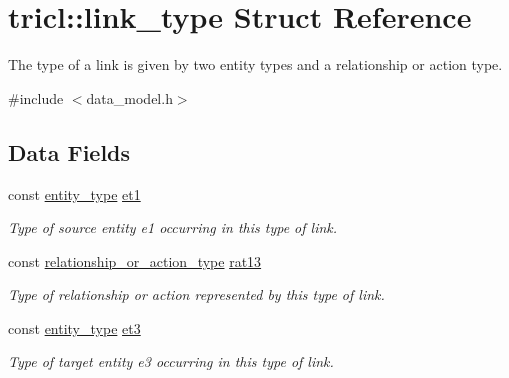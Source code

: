 \hypertarget{structtricl_1_1link__type}{}\section{tricl\+:\+:link\+\_\+type Struct Reference}
\label{structtricl_1_1link__type}


The type of a link is given by two entity types and a relationship or action type.  




{\ttfamily \#include $<$data\+\_\+model.\+h$>$}

\subsection*{Data Fields}
\begin{DoxyCompactItemize}
\item 
\mbox{\label{structtricl_1_1link__type_a9cb3cda7790fc4d697f6274cf0af708c}} 
const \hyperlink{namespacetricl_afd4de3aedd5e48cf955f03457386e98f}{entity\+\_\+type} \hyperlink{structtricl_1_1link__type_a9cb3cda7790fc4d697f6274cf0af708c}{et1}
\begin{DoxyCompactList}\small\item\em Type of source entity e1 occurring in this type of link. \end{DoxyCompactList}\item 
\mbox{\label{structtricl_1_1link__type_ab567b0eff4a068b28141da69c810770d}} 
const \hyperlink{namespacetricl_a2d01894944fb58a8fedc0912a48d13f8}{relationship\+\_\+or\+\_\+action\+\_\+type} \hyperlink{structtricl_1_1link__type_ab567b0eff4a068b28141da69c810770d}{rat13}
\begin{DoxyCompactList}\small\item\em Type of relationship or action represented by this type of link. \end{DoxyCompactList}\item 
\mbox{\label{structtricl_1_1link__type_ae89141e8c4719830d32c0d7fe95a184f}} 
const \hyperlink{namespacetricl_afd4de3aedd5e48cf955f03457386e98f}{entity\+\_\+type} \hyperlink{structtricl_1_1link__type_ae89141e8c4719830d32c0d7fe95a184f}{et3}
\begin{DoxyCompactList}\small\item\em Type of target entity e3 occurring in this type of link. \end{DoxyCompactList}\end{DoxyCompactItemize}
